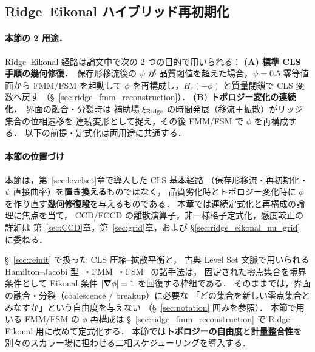 %
%

\subsection{Ridge--Eikonal ハイブリッド再初期化}
\label{sec:ridge_eikonal}

\paragraph{本節の 2 用途．}
Ridge--Eikonal 経路は論文中で次の 2 つの目的で用いられる：
\textbf{(A) 標準 CLS 手順の幾何修復．}~保存形移流後の $\psi$ が
品質閾値を超えた場合，$\psi=0.5$ 零等値面から FMM/FSM を起動して
$\phi$ を再構成し，$H_\varepsilon(-\phi)$ と質量閉鎖で CLS 変数へ戻す
（§~\ref{sec:ridge_fmm_reconstruction}）．
\textbf{(B) トポロジー変化の連続化．}~界面の融合・分裂時は
補助場 $\xi_{\text{Ridge}}$ の時間発展（移流＋拡散）がリッジ集合の位相遷移を
連続変形として捉え，その後 FMM/FSM で $\phi$ を再構成する．
以下の前提・定式化は両用途に共通する．

\paragraph{本節の位置づけ}
本節は，第~\ref{sec:levelset}章で導入した CLS 基本経路
（保存形移流・再初期化・$\psi$ 直接曲率）を\textbf{置き換える}ものではなく，
品質劣化時とトポロジー変化時に $\phi$ を作り直す\textbf{幾何修復段}を与えるものである．
本章では連続定式化と再構成の論理に焦点を当て，
CCD/FCCD の離散演算子，非一様格子定式化，感度較正の詳細は
第~\ref{sec:CCD}章，第~\ref{sec:grid}章，および
\S\ref{sec:ridge_eikonal_nu_grid} に委ねる．

§~\ref{sec:reinit} で扱った CLS 圧縮--拡散平衡と，
古典 Level Set 文脈で用いられる Hamilton--Jacobi 型~\cite{JiangPeng2000}・FMM~\cite{Sethian1996}・FSM~\cite{Zhao2005} の諸手法は，
固定された零点集合を境界条件として Eikonal 条件 $|\bm{\nabla}\phi|=1$ を回復する枠組である．
そのままでは，界面の融合・分裂（coalescence / breakup）に必要な
「どの集合を新しい零点集合とみなすか」という自由度を与えない
（§~\ref{sec:notation} 囲みを参照）．
本節で用いる FMM/FSM の $\phi$ 再構成は
§~\ref{sec:ridge_fmm_reconstruction} で Ridge--Eikonal 用に改めて定式化する．
本節では\textbf{トポロジーの自由度}と\textbf{計量整合性}を
別々のスカラー場に担わせる二相スケジューリングを導入する．

